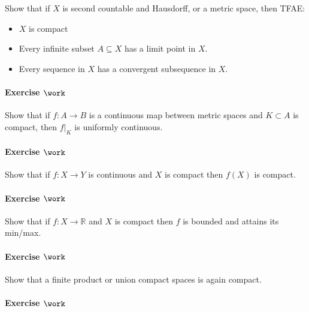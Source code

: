 Show that if \(X\) is second countable and Hausdorff, or a metric space,
then TFAE:

\begin{itemize}
\tightlist
\item
  \(X\) is compact
\item
  Every infinite subset \(A\subseteq X\) has a limit point in \(X\).
\item
  Every sequence in \(X\) has a convergent subsequence in \(X\).
\end{itemize}

\hypertarget{exercise-work-14}{%
\paragraph{\texorpdfstring{Exercise
\(\work\)}{Exercise \textbackslash work}}\label{exercise-work-14}}

Show that if \(f: A\to B\) is a continuous map between metric spaces and
\(K\subset A\) is compact, then \({\left.{{f}} \right|_{{K}} }\) is
uniformly continuous.

\hypertarget{exercise-work-15}{%
\paragraph{\texorpdfstring{Exercise
\(\work\)}{Exercise \textbackslash work}}\label{exercise-work-15}}

Show that if \(f:X\to Y\) is continuous and \(X\) is compact then
\(f(X)\) is compact.

\hypertarget{exercise-work-16}{%
\paragraph{\texorpdfstring{Exercise
\(\work\)}{Exercise \textbackslash work}}\label{exercise-work-16}}

Show that if \(f:X\to {\mathbb{R}}\) and \(X\) is compact then \(f\) is
bounded and attains its min/max.

\hypertarget{exercise-work-17}{%
\paragraph{\texorpdfstring{Exercise
\(\work\)}{Exercise \textbackslash work}}\label{exercise-work-17}}

Show that a finite product or union compact spaces is again compact.

\hypertarget{exercise-work-18}{%
\paragraph{\texorpdfstring{Exercise
\(\work\)}{Exercise \textbackslash work}}\label{exercise-work-18}}

